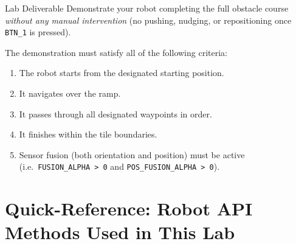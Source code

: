 \documentclass[12pt,letterpaper]{article}
\begin{document}
\begin{taskbox}{Lab Deliverable}
  Demonstrate your robot completing the full obstacle course \emph{without
  any manual intervention} (no pushing, nudging, or repositioning once
  \texttt{BTN\_1} is pressed).
\end{taskbox}

The demonstration must satisfy all of the following criteria:

\begin{enumerate}
  \item The robot starts from the designated starting position.
  \item It navigates over the ramp.
  \item It passes through all designated waypoints in order.
  \item It finishes within the tile boundaries.
  \item Sensor fusion (both orientation and position) must be active
        (i.e.\ \texttt{FUSION\_ALPHA~>~0} and \texttt{POS\_FUSION\_ALPHA~>~0}).
\end{enumerate}


\newpage

\appendix
\section{Quick-Reference: Robot API Methods Used in This Lab}
\end{document}
